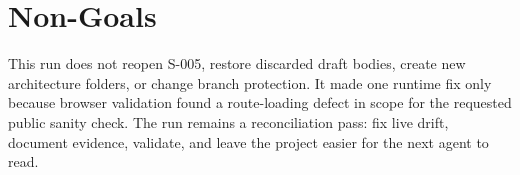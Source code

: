 \documentclass[a4paper,11pt,openany]{report}
\begin{document}
\chapter{Non-Goals}

This run does not reopen S-005, restore discarded draft bodies, create new
architecture folders, or change branch protection. It made one runtime fix only
because browser validation found a route-loading defect in scope for the
requested public sanity check. The run remains a reconciliation pass: fix live
drift, document evidence, validate, and leave the project easier for the next
agent to read.
\end{document}
